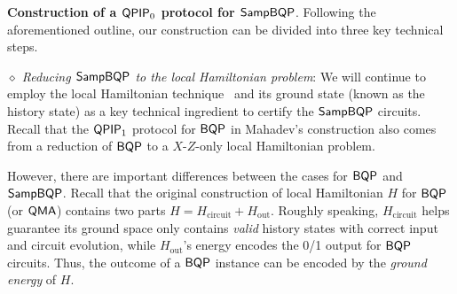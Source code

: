 



\vspace{2mm} \noindent \textbf{Construction of a $\operatorname{\mathsf{QPIP}}_0$ protocol for $\operatorname{\mathsf{SampBQP}}$}. 
Following the aforementioned outline, our construction can be divided into three key technical steps. 



\vspace{2mm} \noindent \emph{$\diamond$ Reducing  $\operatorname{\mathsf{SampBQP}}$ to the local Hamiltonian problem}: We will continue to employ the local Hamiltonian technique~\cite{kitaev2002classical} and its ground state (known as the history state) as a key technical ingredient to certify the $\operatorname{\mathsf{SampBQP}}$ circuits. 
Recall that the $\operatorname{\mathsf{QPIP}}_1$ protocol for $\operatorname{\mathsf{BQP}}$ in Mahadev's construction also comes from a reduction of $\operatorname{\mathsf{BQP}}$ to a $X$-$Z$-only local Hamiltonian problem. 

However, there are important differences between the cases for $\operatorname{\mathsf{BQP}}$ and $\operatorname{\mathsf{SampBQP}}$. Recall that the original construction of local Hamiltonian $H$ for $\operatorname{\mathsf{BQP}}$ (or $\operatorname{\mathsf{QMA}}$) contains two parts $H=H_{\mathrm{circuit}}+ H_{\mathrm{out}}$.
Roughly speaking, $H_{\mathrm{circuit}}$ helps guarantee its ground space only contains \emph{valid} history states with correct input and circuit evolution, while $H_{\mathrm{out}}$'s energy encodes the 0/1 output for $\operatorname{\mathsf{BQP}}$ circuits.
Thus, the outcome of a $\operatorname{\mathsf{BQP}}$ instance can be encoded by the \emph{ground energy} of $H$.

